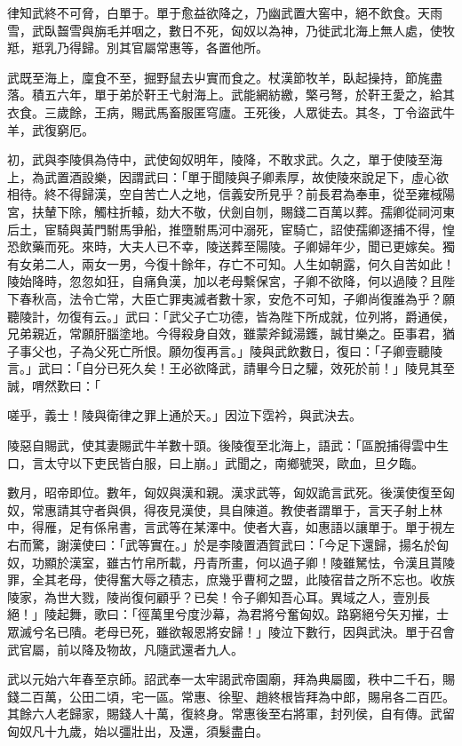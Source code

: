 \begin{pinyinscope}
律知武終不可脅，白單于。單于愈益欲降之，乃幽武置大窖中，絕不飲食。天雨雪，武臥齧雪與旃毛并咽之，數日不死，匈奴以為神，乃徙武北海上無人處，使牧羝，羝乳乃得歸。別其官屬常惠等，各置他所。

武既至海上，廩食不至，掘野鼠去屮實而食之。杖漢節牧羊，臥起操持，節旄盡落。積五六年，單于弟於靬王弋射海上。武能網紡繳，檠弓弩，於靬王愛之，給其衣食。三歲餘，王病，賜武馬畜服匿穹廬。王死後，人眾徙去。其冬，丁令盜武牛羊，武復窮厄。

初，武與李陵俱為侍中，武使匈奴明年，陵降，不敢求武。久之，單于使陵至海上，為武置酒設樂，因謂武曰：「單于聞陵與子卿素厚，故使陵來說足下，虛心欲相待。終不得歸漢，空自苦亡人之地，信義安所見乎？前長君為奉車，從至雍棫陽宮，扶輦下除，觸柱折轅，劾大不敬，伏劍自刎，賜錢二百萬以葬。孺卿從祠河東后土，宦騎與黃門駙馬爭船，推墮駙馬河中溺死，宦騎亡，詔使孺卿逐捕不得，惶恐飲藥而死。來時，大夫人已不幸，陵送葬至陽陵。子卿婦年少，聞已更嫁矣。獨有女弟二人，兩女一男，今復十餘年，存亡不可知。人生如朝露，何久自苦如此！陵始降時，忽忽如狂，自痛負漢，加以老母繫保宮，子卿不欲降，何以過陵？且陛下春秋高，法令亡常，大臣亡罪夷滅者數十家，安危不可知，子卿尚復誰為乎？願聽陵計，勿復有云。」武曰：「武父子亡功德，皆為陛下所成就，位列將，爵通侯，兄弟親近，常願肝腦塗地。今得殺身自效，雖蒙斧鉞湯鑊，誠甘樂之。臣事君，猶子事父也，子為父死亡所恨。願勿復再言。」陵與武飲數日，復曰：「子卿壹聽陵言。」武曰：「自分已死久矣！王必欲降武，請畢今日之驩，效死於前！」陵見其至誠，喟然歎曰：「

嗟乎，義士！陵與衛律之罪上通於天。」因泣下霑衿，與武決去。

陵惡自賜武，使其妻賜武牛羊數十頭。後陵復至北海上，語武：「區脫捕得雲中生口，言太守以下吏民皆白服，曰上崩。」武聞之，南鄉號哭，歐血，旦夕臨。

數月，昭帝即位。數年，匈奴與漢和親。漢求武等，匈奴詭言武死。後漢使復至匈奴，常惠請其守者與俱，得夜見漢使，具自陳道。教使者謂單于，言天子射上林中，得雁，足有係帛書，言武等在某澤中。使者大喜，如惠語以讓單于。單于視左右而驚，謝漢使曰：「武等實在。」於是李陵置酒賀武曰：「今足下還歸，揚名於匈奴，功顯於漢室，雖古竹帛所載，丹青所畫，何以過子卿！陵雖駑怯，令漢且貰陵罪，全其老母，使得奮大辱之積志，庶幾乎曹柯之盟，此陵宿昔之所不忘也。收族陵家，為世大戮，陵尚復何顧乎？已矣！令子卿知吾心耳。異域之人，壹別長絕！」陵起舞，歌曰：「徑萬里兮度沙幕，為君將兮奮匈奴。路窮絕兮矢刃摧，士眾滅兮名已隤。老母已死，雖欲報恩將安歸！」陵泣下數行，因與武決。單于召會武官屬，前以降及物故，凡隨武還者九人。

武以元始六年春至京師。詔武奉一太牢謁武帝園廟，拜為典屬國，秩中二千石，賜錢二百萬，公田二頃，宅一區。常惠、徐聖、趙終根皆拜為中郎，賜帛各二百匹。其餘六人老歸家，賜錢人十萬，復終身。常惠後至右將軍，封列侯，自有傳。武留匈奴凡十九歲，始以彊壯出，及還，須髮盡白。


\end{pinyinscope}
